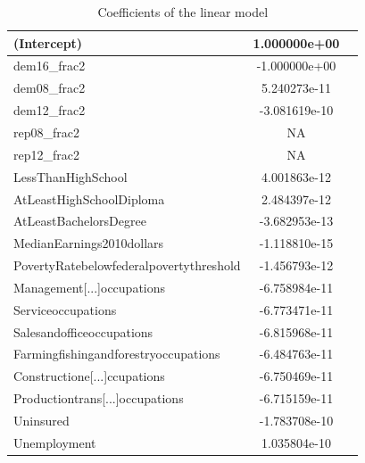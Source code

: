 \documentclass[11pt, conference,compsoc]{IEEEtran}
\begin{document}
\begin{table}
\begin{center}
\caption{Coefficients of the linear model}
\label{coefflm}
\begin{tabular}{ |l |c| c |}
\hline
(Intercept)& 1.000000e+00 \\ \hline
dem16\_frac2 &-1.000000e+00  \\ \hline
dem08\_frac2 &5.240273e-11 \\ \hline
dem12\_frac2 &-3.081619e-10 \\ \hline
rep08\_frac2 &NA \\ \hline
rep12\_frac2 &NA \\ \hline
LessThanHighSchool &4.001863e-12 \\ \hline
AtLeastHighSchoolDiploma &2.484397e-12 \\ \hline
AtLeastBachelorsDegree &-3.682953e-13 \\ \hline
MedianEarnings2010dollars &-1.118810e-15 \\ \hline
PovertyRatebelowfederalpovertythreshold &-1.456793e-12 \\ \hline
Management[...]occupations &-6.758984e-11 \\ \hline
Serviceoccupations &-6.773471e-11 \\ \hline
Salesandofficeoccupations &-6.815968e-11 \\ \hline
Farmingfishingandforestryoccupations &-6.484763e-11 \\ \hline 
Constructione[...]ccupations &-6.750469e-11\\ \hline 
Productiontrans[...]occupations &-6.715159e-11 \\ \hline
Uninsured &-1.783708e-10 \\ \hline
Unemployment &1.035804e-10\\ \hline
\end{tabular}
\end{center}
\end{table}
\end{document}
